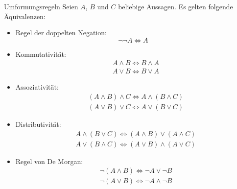 \begin{definition}{Umformungsregeln}
    Seien $A$, $B$ und $C$ beliebige Aussagen.
    Es gelten folgende Äquivalenzen:
    \begin{itemize}
        \setlength{\itemsep}{0pt}
        \setlength{\parskip}{0pt}
        \setlength{\parsep}{0pt}
        \item Regel der doppelten Negation: \[\neg\neg A \Leftrightarrow A\]
        \item Kommutativität:
        \vspace{-\topsep}
        \begin{align*}
            &A \land B \Leftrightarrow B \land A\\
            &A \lor B \Leftrightarrow B \lor A
        \end{align*}
        \item Assoziativität:
        \vspace{-\topsep}
        \begin{align*}
            &(A \land B) \land C \Leftrightarrow A \land (B \land C)\\
            &(A \lor B) \lor C \Leftrightarrow A \lor (B \lor C)
        \end{align*}
        \item Distributivität:
        \vspace{-\topsep}
        \begin{align*}
            &A \land (B \lor C) \Leftrightarrow (A \land B) \lor (A \land C)\\
            &A \lor (B \land C) \Leftrightarrow (A \lor B) \land (A \lor C)
        \end{align*}
        \item Regel von De Morgan:
        \vspace{-\topsep}
        \begin{align*}
            &\neg (A \land B) \Leftrightarrow \neg A \lor \neg B\\
            &\neg (A \lor B) \Leftrightarrow \neg A \land \neg B
        \end{align*}
    \end{itemize}
\end{definition}

